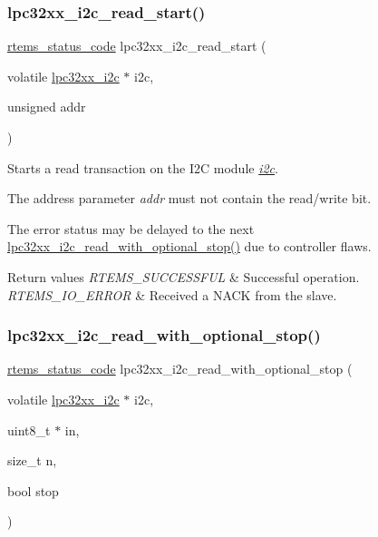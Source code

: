 \subsubsection{\texorpdfstring{lpc32xx\_i2c\_read\_start()}{lpc32xx\_i2c\_read\_start()}}
{\footnotesize\ttfamily \mbox{\hyperlink{group__ClassicStatus_ga545d41846817eaba6143d52ee4d9e9fe}{rtems\+\_\+status\+\_\+code}} lpc32xx\+\_\+i2c\+\_\+read\+\_\+start (\begin{DoxyParamCaption}\item[{volatile \mbox{\hyperlink{structlpc32xx__i2c}{lpc32xx\+\_\+i2c}} $\ast$}]{i2c,  }\item[{unsigned}]{addr }\end{DoxyParamCaption})}



Starts a read transaction on the I2C module {\itshape \mbox{\hyperlink{structi2c}{i2c}}}. 

The address parameter {\itshape addr} must not contain the read/write bit.

The error status may be delayed to the next \mbox{\hyperlink{group__lpc32xx__i2c_ga5629b64177b57968d83d488db11e069c}{lpc32xx\+\_\+i2c\+\_\+read\+\_\+with\+\_\+optional\+\_\+stop()}} due to controller flaws.


\begin{DoxyRetVals}{Return values}
{\em R\+T\+E\+M\+S\+\_\+\+S\+U\+C\+C\+E\+S\+S\+F\+UL} & Successful operation. \\
\hline
{\em R\+T\+E\+M\+S\+\_\+\+I\+O\+\_\+\+E\+R\+R\+OR} & Received a N\+A\+CK from the slave. \\
\hline
\end{DoxyRetVals}
\mbox{\label{group__lpc32xx__i2c_ga5629b64177b57968d83d488db11e069c}} 
\subsubsection{\texorpdfstring{lpc32xx\_i2c\_read\_with\_optional\_stop()}{lpc32xx\_i2c\_read\_with\_optional\_stop()}}
{\footnotesize\ttfamily \mbox{\hyperlink{group__ClassicStatus_ga545d41846817eaba6143d52ee4d9e9fe}{rtems\+\_\+status\+\_\+code}} lpc32xx\+\_\+i2c\+\_\+read\+\_\+with\+\_\+optional\+\_\+stop (\begin{DoxyParamCaption}\item[{volatile \mbox{\hyperlink{structlpc32xx__i2c}{lpc32xx\+\_\+i2c}} $\ast$}]{i2c,  }\item[{uint8\+\_\+t $\ast$}]{in,  }\item[{size\+\_\+t}]{n,  }\item[{bool}]{stop }\end{DoxyParamCaption})}



